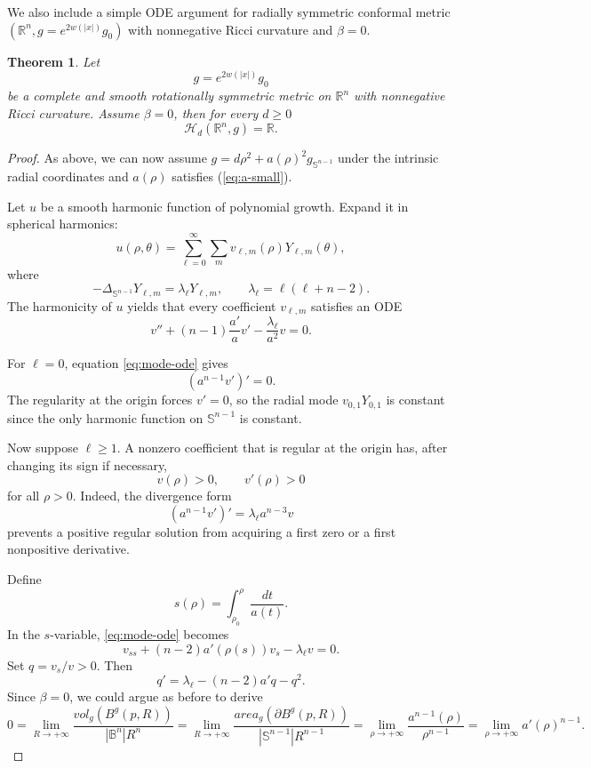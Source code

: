 \documentclass[12pt]{amsart}
\theoremstyle{plain}
\newtheorem{theorem}{Theorem}[section]
\theoremstyle{definition}
\theoremstyle{remark}     %
\numberwithin{equation}{section}
\newcommand{\R}{\mathbb{R}}
\begin{document}
We also include a simple ODE argument for radially symmetric conformal metric $(\mathbb{R}^n, g=e^{2w(|x|)}g_0)$ with nonnegative Ricci curvature and $\beta=0$.

\begin{theorem}\label{thm:radial}
Let
\[
 g=e^{2w(|x|)}g_{0}
\]
be a complete and smooth rotationally symmetric metric on $\R^n$ with nonnegative Ricci curvature. Assume
$\beta=0$, then for every $d\ge0$
\[
 \mathcal{H}_d(\R^n,g)=\R.
\]
\end{theorem}

\begin{proof}
As above, we can now assume 
$g=d\rho^2+a(\rho)^2g_{\mathbb{S}^{n-1}}$ under the intrinsic radial coordinates and $a(\rho)$ satisfies (\ref{eq:a-small}).

Let $u$ be a smooth harmonic function of polynomial growth.  Expand it in spherical harmonics:
\[
 u(\rho,\theta)
 =\sum_{\ell=0}^\infty\sum_m
 v_{\ell,m}(\rho)Y_{\ell,m}(\theta),
\]
where
\[
 -\Delta_{\mathbb{S}^{n-1}}Y_{\ell,m}
 =\lambda_\ell Y_{\ell,m},
 \qquad
 \lambda_\ell=\ell(\ell+n-2).
\]
The harmonicity of $u$ yields that every coefficient $v_{\ell,m}$ satisfies an ODE
\begin{equation}\label{eq:mode-ode}
 v''+(n-1)\frac{a'}a v'
 -\frac{\lambda_\ell}{a^2}v=0.
\end{equation}

For $\ell=0$, equation \cref{eq:mode-ode} gives
\[
 (a^{n-1}v')'=0.
\]
The regularity at the origin forces $v'=0$, so the radial mode $ v_{0,1}Y_{0,1}$ is constant since the only harmonic function on $\mathbb{S}^{n-1}$ is constant. 

Now suppose $\ell\ge1$.  A nonzero coefficient that is regular at the origin has, after changing its sign if necessary,
\[
 v(\rho)>0,
 \qquad
 v'(\rho)>0
\]
for all $\rho>0$.  Indeed, the divergence form
\[
 (a^{n-1}v')'=\lambda_\ell a^{n-3}v
\]
prevents a positive regular solution from acquiring a first zero or a first nonpositive derivative.

Define
\[
 s(\rho)=\int_{\rho_0}^{\rho}\frac{dt}{a(t)}.
\]
In the $s$-variable, \cref{eq:mode-ode} becomes
\[
 v_{ss}+(n-2)a'(\rho(s))v_s-\lambda_\ell v=0.
\]
Set $q=v_s/v>0$.  Then
\begin{equation}\label{eq:riccati}
 q'=\lambda_\ell-(n-2)a' q-q^2.
\end{equation}
Since $\beta=0$, we could argue as before to derive 
\begin{equation}\label{eq:a-small_radial case}
    0=\lim_{R\to+\infty}
    \frac{vol_{g}(B^{g}(p,R))}{|\mathbb{B}^n|R^n}
    =\lim_{R\to+\infty}
    \frac{area_{g}
    (\partial B^{g}(p,R))}{|\mathbb{S}^{n-1}|R^{n-1}}
    =\lim_{\rho\to+\infty}
    \frac{a^{n-1}(\rho)}{\rho^{n-1}}
    =\lim_{\rho\to+\infty}a'(\rho)^{n-1}.
\end{equation}


\end{proof}
\end{document}
